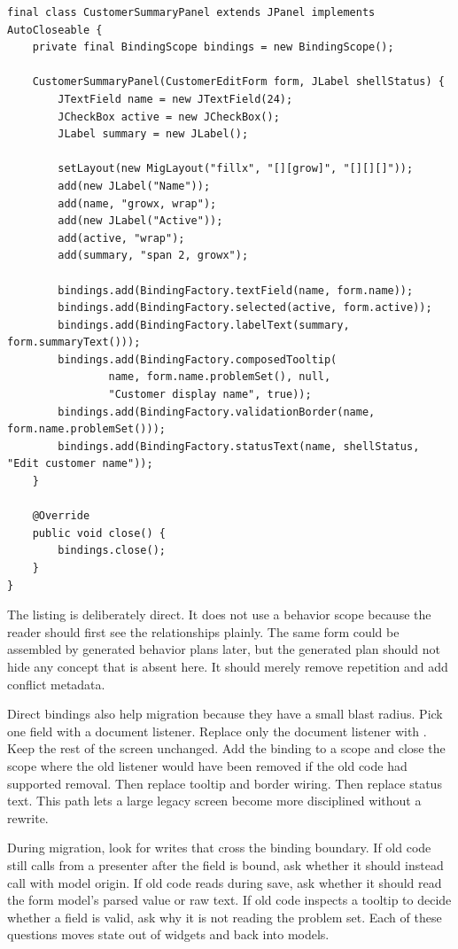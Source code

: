 \begin{lstlisting}[caption={Direct binding assembly order for a small form.}]
final class CustomerSummaryPanel extends JPanel implements AutoCloseable {
    private final BindingScope bindings = new BindingScope();

    CustomerSummaryPanel(CustomerEditForm form, JLabel shellStatus) {
        JTextField name = new JTextField(24);
        JCheckBox active = new JCheckBox();
        JLabel summary = new JLabel();

        setLayout(new MigLayout("fillx", "[][grow]", "[][][]"));
        add(new JLabel("Name"));
        add(name, "growx, wrap");
        add(new JLabel("Active"));
        add(active, "wrap");
        add(summary, "span 2, growx");

        bindings.add(BindingFactory.textField(name, form.name));
        bindings.add(BindingFactory.selected(active, form.active));
        bindings.add(BindingFactory.labelText(summary, form.summaryText()));
        bindings.add(BindingFactory.composedTooltip(
                name, form.name.problemSet(), null,
                "Customer display name", true));
        bindings.add(BindingFactory.validationBorder(name, form.name.problemSet()));
        bindings.add(BindingFactory.statusText(name, shellStatus, "Edit customer name"));
    }

    @Override
    public void close() {
        bindings.close();
    }
}
\end{lstlisting}

The listing is deliberately direct. It does not use a behavior scope because
the reader should first see the relationships plainly. The same form could be
assembled by generated behavior plans later, but the generated plan should not
hide any concept that is absent here. It should merely remove repetition and
add conflict metadata.

Direct bindings also help migration because they have a small blast radius.
Pick one field with a document listener. Replace only the document listener
with . Keep the rest of the screen unchanged.
Add the binding to a scope and close the scope where the old listener would
have been removed if the old code had supported removal. Then replace tooltip
and border wiring. Then replace status text. This path lets a large legacy
screen become more disciplined without a rewrite.

During migration, look for writes that cross the binding boundary. If old code
still calls  from a presenter after the field is bound,
ask whether it should instead call  with model
origin. If old code reads  during save, ask whether it
should read the form model's parsed value or raw text. If old code inspects a
tooltip to decide whether a field is valid, ask why it is not reading the
problem set. Each of these questions moves state out of widgets and back into
models.

